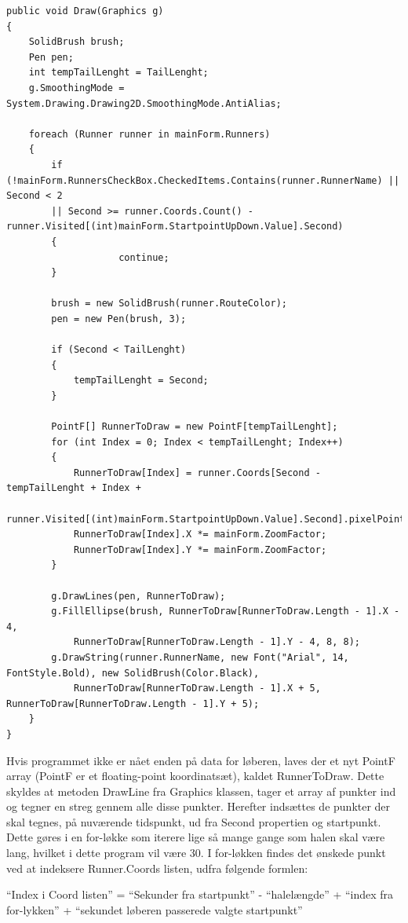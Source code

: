 \begin{lstlisting}
public void Draw(Graphics g)
{
    SolidBrush brush;
    Pen pen;
    int tempTailLenght = TailLenght;
    g.SmoothingMode = System.Drawing.Drawing2D.SmoothingMode.AntiAlias;

    foreach (Runner runner in mainForm.Runners)
    {
        if (!mainForm.RunnersCheckBox.CheckedItems.Contains(runner.RunnerName) || Second < 2
        || Second >= runner.Coords.Count() - runner.Visited[(int)mainForm.StartpointUpDown.Value].Second)
        {
                    continue;
        }

        brush = new SolidBrush(runner.RouteColor);
        pen = new Pen(brush, 3);

        if (Second < TailLenght)
        {
            tempTailLenght = Second;
        }

        PointF[] RunnerToDraw = new PointF[tempTailLenght];
        for (int Index = 0; Index < tempTailLenght; Index++)
        {
            RunnerToDraw[Index] = runner.Coords[Second - tempTailLenght + Index +
                runner.Visited[(int)mainForm.StartpointUpDown.Value].Second].pixelPoint;
            RunnerToDraw[Index].X *= mainForm.ZoomFactor;
            RunnerToDraw[Index].Y *= mainForm.ZoomFactor;
        }

        g.DrawLines(pen, RunnerToDraw);
        g.FillEllipse(brush, RunnerToDraw[RunnerToDraw.Length - 1].X - 4,
            RunnerToDraw[RunnerToDraw.Length - 1].Y - 4, 8, 8);
        g.DrawString(runner.RunnerName, new Font("Arial", 14, FontStyle.Bold), new SolidBrush(Color.Black),
            RunnerToDraw[RunnerToDraw.Length - 1].X + 5, RunnerToDraw[RunnerToDraw.Length - 1].Y + 5);
    }
}
\end{lstlisting}

Hvis programmet ikke er nået enden på data for løberen, laves der et nyt PointF array (PointF er et floating-point koordinatsæt), kaldet RunnerToDraw. Dette skyldes at metoden DrawLine fra Graphics klassen, tager et array af punkter ind og tegner en streg gennem alle disse punkter. Herefter indsættes de punkter der skal tegnes, på nuværende tidspunkt, ud fra Second propertien og startpunkt. Dette gøres i en for-løkke som iterere lige så mange gange som halen skal være lang, hvilket i dette program vil være 30. I for-løkken findes det ønskede punkt ved at indeksere Runner.Coords listen, udfra følgende formlen:
 
“Index i Coord listen” = “Sekunder fra startpunkt” - “halelængde” + “index fra for-lykken”  + “sekundet løberen passerede valgte startpunkt”

